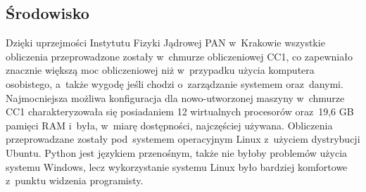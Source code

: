 \subsection{Środowisko}
Dzięki uprzejmości Instytutu Fizyki Jądrowej PAN w~Krakowie wszystkie obliczenia przeprowadzone zostały w~chmurze obliczeniowej CC1, co zapewniało znacznie większą moc obliczeniowej niż w~przypadku użycia komputera osobistego, a~także wygodę jeśli chodzi o~zarządzanie systemem oraz~danymi. Najmocniejsza możliwa konfiguracja dla nowo-utworzonej maszyny w~chmurze CC1 charakteryzowała się posiadaniem 12 wirtualnych procesorów oraz~19,6 GB pamięci RAM i~była, w~miarę dostępności, najczęściej używana. Obliczenia przeprowadzane zostały pod~systemem operacyjnym Linux z~użyciem dystrybucji Ubuntu. Python jest językiem przenośnym, także nie byłoby problemów użycia systemu Windows, lecz wykorzystanie systemu Linux było bardziej komfortowe z~punktu widzenia programisty.

